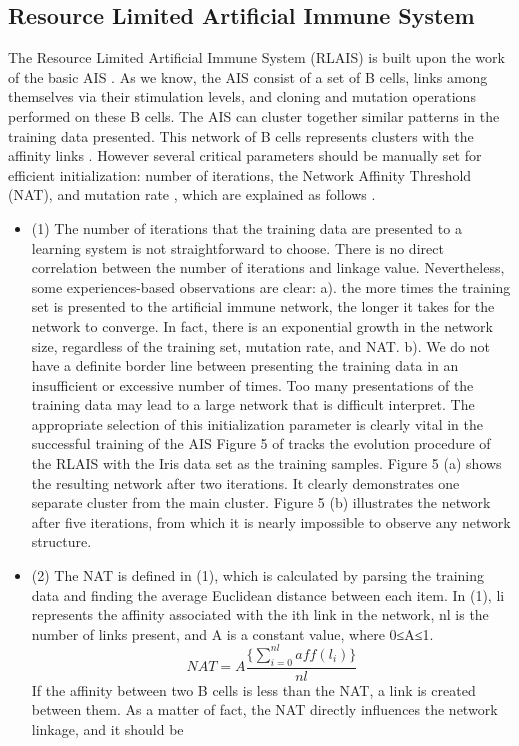 \documentclass{article}
\begin{document}
\subsection{Resource Limited Artificial Immune System}
The Resource Limited Artificial Immune System (RLAIS) is built upon the work of the basic AIS . As we know, the AIS consist of a set of B cells, links among themselves via
their stimulation levels, and cloning and mutation operations performed on these B cells. The AIS can cluster together similar patterns in the training data presented. This network of B cells represents clusters with the affinity links . However several critical parameters should be manually set for efficient initialization: number of iterations, the Network Affinity Threshold (NAT), and mutation rate , which are explained as follows .
\begin{itemize}
    \item {(1) The number of iterations that the training data are presented to a learning system is not straightforward to choose. There is no direct correlation between the number of iterations and linkage value. Nevertheless, some experiences-based observations are clear: a). the more times the training set is presented to the artificial immune network, the longer it takes for the network to converge. In fact, there is an exponential growth in the network size, regardless of the training set, mutation rate, and NAT. b). We do not have a definite border line between presenting the training data in an insufficient or excessive number of times. Too many presentations of the training data may lead to a large network that is difficult interpret. The appropriate selection of this initialization parameter is clearly vital in the successful training of the AIS Figure 5 of tracks the evolution procedure of the RLAIS with the Iris data set as the training samples. Figure 5 (a) shows the resulting network after two iterations. It clearly demonstrates one separate cluster from the main cluster. Figure 5 (b) illustrates the network after five iterations, from which it is nearly impossible to observe any network structure.
}
    \item {(2) The NAT is defined in (1), which is calculated by parsing the training data and finding the average Euclidean distance between each item. In (1), li represents the affinity associated with the ith link in the network, nl is the number of links present, and A is a constant value, where 0≤A≤1.
    \[{NAT}=A \frac{\{\sum_{i=0}^{nl}{aff}(l_i)\}}{nl}  \]
    If the affinity between two B cells is less than the NAT, a link is created between them. As a matter of fact, the NAT directly influences the network linkage, and it should be
}
\end{itemize}
\end{document}

